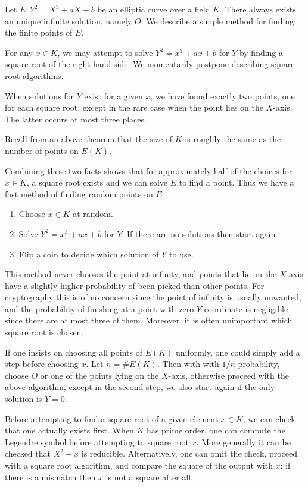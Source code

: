 Let $E : Y^2 = X^3 + a X + b$ be an elliptic curve over a field $K$. There
always exists an unique infinite solution, namely $O$. We describe a simple
method for finding the finite points of $E$.

For any $x \in K$, we may attempt to solve $Y^2 = x^3 + a x + b$ for $Y$ by
finding a square root of the right-hand side. We momentarily postpone
describing square-root algorithms.

When solutions for $Y$ exist for a given $x$, we have found exactly two
points, one for each square root, except in the rare case when the point lies
on the $X$-axis. The latter occurs at most three places.

Recall from an above theorem that the size of $K$ is roughly the same
as the number of points on $E(K)$.

Combining these two facts shows that for approximately half of the choices for
$x \in K$, a square root exists and we can solve $E$ to find a point. Thus we
have a fast method of finding random points on $E$:

\begin{enumerate}
\item
Choose $x \in K$ at random.
\item
Solve $Y^2 = x^3 + a x + b$ for $Y$. If there are no solutions
then start again.
\item
Flip a coin to decide which solution of $Y$ to use.
\end{enumerate}

This method never chooses the point at infinity, and points that lie on the
$X$-axis have a slightly higher probability of been picked than other points.
For cryptography this is of no concern since the point of infinity is usually
unwanted, and the probability of finishing at a point with zero $Y$-coordinate
is negligible since there are at most three of them. Moreover, it is often
unimportant which square root is chosen.

If one insists on choosing all points of $E(K)$ uniformly, one could simply add
a step before choosing $x$. Let $n = \#E(K)$. Then with with $1/n$ probability,
choose $O$ or one of the points lying on the $X$-axis, otherwise proceed with
the above algorithm, except in the second step, we also start again if
the only solution is $Y = 0$.

Before attempting to find a square root of a given element $x \in K$, we can
check that one actually exists first. When $K$ has prime order, one can compute
the Legendre symbol before attempting to square root $x$. More generally it can
be checked that $X^2 - x$ is reducible. Alternatively, one can omit the check,
proceed with a square root algorithm, and compare the square of the output with
$x$: if there is a mismatch then $x$ is not a square after all.

